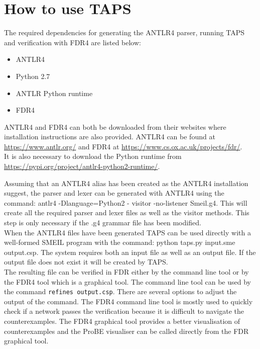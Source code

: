 


\newpage
\section{How to use TAPS}
The required dependencies for generating the ANTLR4 parser, running TAPS and verification with FDR4 are listed below:
\begin{itemize}
    \item ANTLR4
    \item Python 2.7
    \item ANTLR Python runtime
    \item FDR4
\end{itemize}

ANTLR4 and FDR4 can both be downloaded from their websites where installation instructions are also provided.
ANTLR4 can be found at \url{https://www.antlr.org/} and FDR4 at \url{https://www.cs.ox.ac.uk/projects/fdr/}.\\
It is also necessary to download the Python runtime from \url{https://pypi.org/project/antlr4-python2-runtime/}.

Assuming that an ANTLR4 alias has been created as the ANTLR4 installation suggest, the parser and lexer can be generated with ANTLR4 using the command: {\ttfamily antlr4 -Dlanguage=Python2 - visitor -no-listener Smeil.g4.}
This will create all the required parser and lexer files as well as the visitor methods. This step is only necessary if the .g4 grammar file has been modified.\\

When the ANTLR4 files have been generated TAPS can be used directly with a well-formed SMEIL program with the command: {\ttfamily python taps.py input.sme output.csp}. The system requires both an input file as well as an output file. If the output file does not exist it will be created by TAPS. \\

The resulting \cspm{} file can be verified in FDR either by the command line tool or by the FDR4 tool which is a graphical tool. The command line tool can be used by the command \texttt{refines output.csp}. There are several options to adjust the output of the command. The FDR4 command line tool is mostly used to quickly check if a network passes the verification because it is difficult to navigate the counterexamples. The FDR4 graphical tool provides a better visualisation of counterexamples and the ProBE visualiser can be called directly from the FDR graphical tool.

